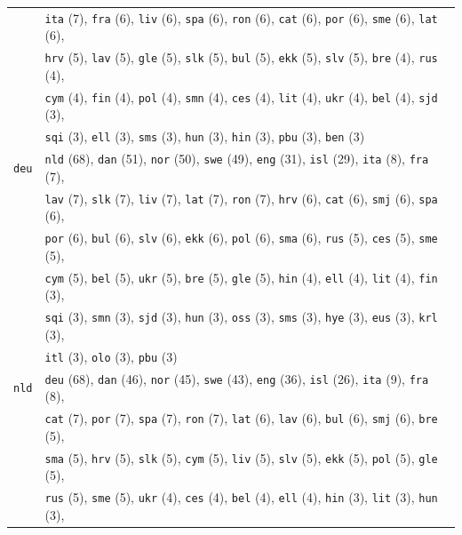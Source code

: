 \begin{center}
\begin{longtable}{ll}
 & \texttt{ita} (7), \texttt{fra} (6), \texttt{liv} (6), \texttt{spa} (6), \texttt{ron} (6), \texttt{cat} (6), \texttt{por} (6), \texttt{sme} (6), \texttt{lat} (6),\\
 & \texttt{hrv} (5), \texttt{lav} (5), \texttt{gle} (5), \texttt{slk} (5), \texttt{bul} (5), \texttt{ekk} (5), \texttt{slv} (5), \texttt{bre} (4), \texttt{rus} (4),\\
 & \texttt{cym} (4), \texttt{fin} (4), \texttt{pol} (4), \texttt{smn} (4), \texttt{ces} (4), \texttt{lit} (4), \texttt{ukr} (4), \texttt{bel} (4), \texttt{sjd} (3),\\
 & \texttt{sqi} (3), \texttt{ell} (3), \texttt{sms} (3), \texttt{hun} (3), \texttt{hin} (3), \texttt{pbu} (3), \texttt{ben} (3) \\
\texttt{deu} & \texttt{nld} (68), \texttt{dan} (51), \texttt{nor} (50), \texttt{swe} (49), \texttt{eng} (31), \texttt{isl} (29), \texttt{ita} (8), \texttt{fra} (7),\\
 & \texttt{lav} (7), \texttt{slk} (7), \texttt{liv} (7), \texttt{lat} (7), \texttt{ron} (7), \texttt{hrv} (6), \texttt{cat} (6), \texttt{smj} (6), \texttt{spa} (6),\\
 & \texttt{por} (6), \texttt{bul} (6), \texttt{slv} (6), \texttt{ekk} (6), \texttt{pol} (6), \texttt{sma} (6), \texttt{rus} (5), \texttt{ces} (5), \texttt{sme} (5),\\
 & \texttt{cym} (5), \texttt{bel} (5), \texttt{ukr} (5), \texttt{bre} (5), \texttt{gle} (5), \texttt{hin} (4), \texttt{ell} (4), \texttt{lit} (4), \texttt{fin} (3),\\
 & \texttt{sqi} (3), \texttt{smn} (3), \texttt{sjd} (3), \texttt{hun} (3), \texttt{oss} (3), \texttt{sms} (3), \texttt{hye} (3), \texttt{eus} (3), \texttt{krl} (3),\\
 & \texttt{itl} (3), \texttt{olo} (3), \texttt{pbu} (3) \\
\texttt{nld} & \texttt{deu} (68), \texttt{dan} (46), \texttt{nor} (45), \texttt{swe} (43), \texttt{eng} (36), \texttt{isl} (26), \texttt{ita} (9), \texttt{fra} (8),\\
 & \texttt{cat} (7), \texttt{por} (7), \texttt{spa} (7), \texttt{ron} (7), \texttt{lat} (6), \texttt{lav} (6), \texttt{bul} (6), \texttt{smj} (6), \texttt{bre} (5),\\
 & \texttt{sma} (5), \texttt{hrv} (5), \texttt{slk} (5), \texttt{cym} (5), \texttt{liv} (5), \texttt{slv} (5), \texttt{ekk} (5), \texttt{pol} (5), \texttt{gle} (5),\\
 & \texttt{rus} (5), \texttt{sme} (5), \texttt{ukr} (4), \texttt{ces} (4), \texttt{bel} (4), \texttt{ell} (4), \texttt{hin} (3), \texttt{lit} (3), \texttt{hun} (3),\\

\end{longtable}
\end{center}
